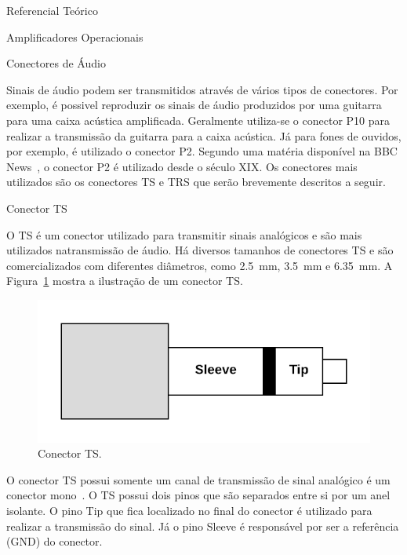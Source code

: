 \begin{chapter}{Referencial Teórico}
\begin{section}{Amplificadores Operacionais}
\end{section}


\begin{section}{Conectores de Áudio}

Sinais de áudio podem ser transmitidos através de vários tipos de conectores.
Por exemplo, é possivel reproduzir os sinais de áudio produzidos por uma
guitarra para uma caixa acústica amplificada. Geralmente utiliza-se o conector
P10 para realizar a transmissão da guitarra para a caixa acústica. Já para fones
de ouvidos, por exemplo, é utilizado o conector P2. Segundo uma matéria
disponível na BBC News~\cite{BBC}, o conector P2 é utilizado desde o século XIX.
Os conectores mais utilizados são os conectores TS e TRS que serão brevemente
descritos a seguir.

\begin{subsection}{Conector TS}

O TS é um conector utilizado para transmitir sinais analógicos e são mais
utilizados natransmissão de áudio. Há diversos tamanhos de conectores TS e são
comercializados com diferentes diâmetros, como 2.5~mm, 3.5~mm e 6.35~mm. A
Figura~\ref{fig:TS} mostra a ilustração de um conector TS.

\begin{figure}[!h]
	\centering
	\begin{minipage}[c]{\textwidth}
	\centering
	\includegraphics[width=0.9\linewidth]{fig/ts}
	\caption{Conector TS.}
	\label{fig:TS}
	\end{minipage}
\end{figure} 

O conector TS possui somente um canal de transmissão de sinal analógico é
um conector mono~\cite{ts}. O TS possui dois pinos que são separados entre si por
um anel isolante. O pino Tip que  fica localizado no final do conector é 
utilizado para realizar a  transmissão do sinal. Já o pino Sleeve é responsável
por ser a referência (GND) do conector.

\end{subsection}


\end{section}
\end{chapter}
